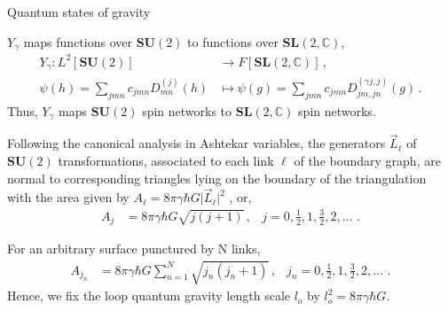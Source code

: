 \documentclass[12pt,titlepage]{article}
\begin{document}
\begin{frame}{Quantum states of gravity}
    \begin{list}{\,}{\leftmargin=1em \itemindent=0em}
        \item<1-> $Y_\gamma$ maps functions over $\mathbf{SU}(2)$ to functions over $\mathbf{SL}(2,\mathbb{C})$,
        \begin{align}
            Y_\gamma:L^2[\mathbf{SU}(2)]&\to F[\mathbf{SL}(2,\mathbb{C})] \,,\\
            \psi(h)= \sum_{jmn}c_{jmn}D^{(j)}_{mn}(h)&\mapsto \psi(g)= \sum_{jmn} c_{jmn}D^{(\gamma j,j)}_{jm,jn}(g)\,.
        \end{align}
        Thus, $Y_\gamma$ maps $\mathbf{SU}(2)$ spin networks to $\mathbf{SL}(2,\mathbb{C})$ spin networks.
        \item<2-> Following the canonical analysis in Ashtekar variables, the generators $\vec{L}_\ell$ of $\mathbf{SU}(2)$ transformations, associated to each link $\ell$ of the boundary graph, are normal to corresponding triangles lying on the boundary of the triangulation with the area given by $A_\ell=8\pi\gamma\hbar G \lvert \vec{L}_\ell \rvert^2$ , or,
        \begin{align}
             A_j&=8\pi\gamma\hbar G\sqrt{j(j+1)}\,, &j=0,\frac{1}{2},1,\frac{3}{2},2,\dots\,\,.
        \end{align}
        \item<3-> For an arbitrary surface punctured by N links,
        \begin{align}
            A_{j_n}&=8\pi\gamma\hbar G\sum_{n=1}^N\sqrt{j_n(j_n+1)}\,, &j_n=0,\frac{1}{2},1,\frac{3}{2},2,\dots\,\,.
        \end{align}
        Hence, we fix the loop quantum gravity length scale $l_o$ by $l_o^2=8\pi\gamma\hbar G$.
    \end{list}
\end{frame}
\end{document}
